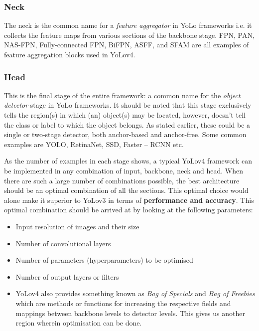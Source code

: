 \subsubsection{Neck}
The neck is the common name for a \textit{feature aggregator} in YoLo frameworks i.e. it collects the feature maps from various sections of the backbone stage. FPN, PAN, NAS-FPN, Fully-connected FPN, BiFPN, ASFF, and SFAM are all examples of feature aggregation blocks used in YoLov4.

\subsubsection{Head}
This is the final stage of the entire framework: a common name for the \textit{object detector} stage in YoLo frameworks. It should be noted that this stage exclusively tells the region(s) in which (an) object(s) may be located, however, doesn’t tell the class or label to which the object belongs. As stated earlier, these could be a single or two-stage detector, both anchor-based and anchor-free. Some common examples are YOLO, RetinaNet, SSD, Faster – RCNN etc.

As the number of examples in each stage shows, a typical YoLov4 framework can be implemented in any combination of input, backbone, neck and head. When there are such a large number of combinations possible, the best architecture should be an optimal combination of all the sections. This optimal choice would alone make it superior to YoLov3 in terms of \textbf{performance and accuracy}. This optimal combination should be arrived at by looking at the following parameters:

\begin{itemize}
\item Input resolution of images and their size
\item Number of convolutional layers
\item Number of parameters (hyperparameters) to be optimised
\item Number of output layers or filters
\item YoLov4 also provides something known as \textit{Bag of Specials} and \textit{Bag of Freebies} which are methods or functions for increasing the respective fields and mappings between backbone levels to detector levels. This gives us another region wherein optimisation can be done.

\end{itemize}

\newpage

